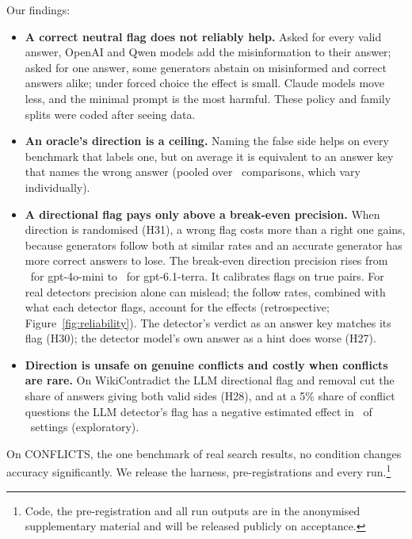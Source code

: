 Our findings:
\begin{itemize}[leftmargin=*,itemsep=1pt,topsep=2pt]
\item \textbf{A correct neutral flag does not reliably help.} Asked for every valid answer, OpenAI and Qwen models add the
misinformation to their answer; asked for one answer, some generators abstain on misinformed and correct answers
alike; under forced choice the effect is small. Claude models move less, and the minimal prompt is the most harmful.
These policy and family splits were coded after seeing data.
\item \textbf{An oracle's direction is a ceiling.} Naming the false side helps on every benchmark that labels one, but
on average it is equivalent to an answer key that names the wrong answer (pooled over \PoolTwentyThreeK\
comparisons, which vary individually).
\item \textbf{A directional flag pays only above a break-even precision.} When direction is randomised (H31), a wrong
flag costs more than a right one gains, because generators follow both at similar rates and an accurate generator has
more correct answers to lose. The break-even direction precision rises from \beMin\ for gpt-4o-mini to \beMax\ for
gpt-6.1-terra. It calibrates flags on true pairs. For real detectors precision alone can mislead; the follow rates, combined with
what each detector flags, account for the effects (retrospective; Figure~\ref{fig:reliability}). The detector's verdict as an answer key matches its flag (H30); the detector model's
own answer as a hint does worse (H27).
\item \textbf{Direction is unsafe on genuine conflicts and costly when conflicts are rare.} On WikiContradict the LLM
directional flag and removal cut the share of answers giving both valid sides (H28), and at a 5\% share of conflict
questions the LLM detector's flag has a negative estimated effect in \prevNegFive\ of \prevN\ settings (exploratory).
\end{itemize}
On CONFLICTS, the one benchmark of real search results, no condition changes accuracy significantly. We release the harness, pre-registrations and every run.\footnote{Code, the pre-registration and
all run outputs are in the anonymised supplementary material and will be released publicly on acceptance.}
